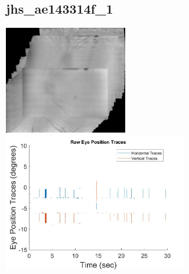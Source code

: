 \documentclass[11pt]{article}
\begin{document}
\subsection{jhs\_ae143314f\_1}
\includegraphics[width=0.40\textwidth, valign=m]{referenceframes/rodenstock_amblyopes/jhs_ae143314f_1_dwt_nostim_gamscaled_bandfilt_refframe.jpg}
\includegraphics[width=0.60\textwidth, valign=m]{eyepositiontraces/rodenstock_amblyopes/jhs_ae143314f_1.jpg}\\
\end{document}
